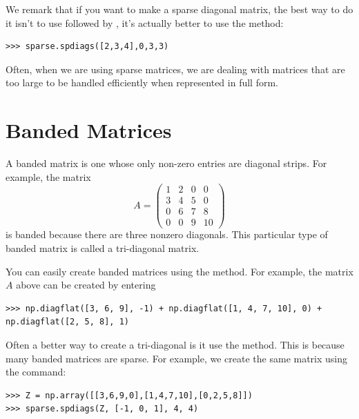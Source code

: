 We remark that if you want to make a sparse diagonal matrix, the
best way to do it isn't to use  followed by ,
it's actually better to use the  method:
\begin{lstlisting}
>>> sparse.spdiags([2,3,4],0,3,3)
\end{lstlisting}
Often, when we are using sparse matrices, we are dealing with matrices
that are too large to be handled efficiently when represented in full form.


\section*{Banded Matrices}
A banded matrix is one whose only non-zero entries are diagonal
strips.  For example, the matrix
\begin{equation*}
A = \begin{pmatrix}
1 & 2 & 0 & 0 \\
3 & 4 & 5 & 0 \\
0 & 6 & 7 & 8 \\
0 & 0 & 9 & 10
\end{pmatrix}
\end{equation*}
is banded because there are three nonzero diagonals.  This
particular type of banded matrix is called a tri-diagonal matrix.

You can easily create banded matrices using the  method.
For example, the matrix $A$ above can be created by entering
\begin{lstlisting}
>>> np.diagflat([3, 6, 9], -1) + np.diagflat([1, 4, 7, 10], 0) + np.diagflat([2, 5, 8], 1)
\end{lstlisting}

Often a better way to create a tri-diagonal is it use the  method.
This is because many banded matrices are sparse.
For example, we create the same matrix using the command:
\begin{lstlisting}
>>> Z = np.array([[3,6,9,0],[1,4,7,10],[0,2,5,8]])
>>> sparse.spdiags(Z, [-1, 0, 1], 4, 4)
\end{lstlisting}

